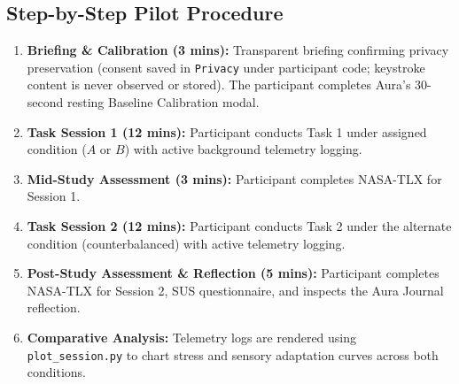 \documentclass[11pt,a4paper]{article}
\begin{document}
\subsection{Step-by-Step Pilot Procedure}
\begin{enumerate}[leftmargin=1.5em, itemsep=3pt]
    \item \textbf{Briefing \& Calibration (3 mins):} Transparent briefing confirming privacy preservation (consent saved in \texttt{Privacy} under participant code; keystroke content is never observed or stored). The participant completes Aura's 30-second resting Baseline Calibration modal.
    \item \textbf{Task Session 1 (12 mins):} Participant conducts Task 1 under assigned condition ($A$ or $B$) with active background telemetry logging.
    \item \textbf{Mid-Study Assessment (3 mins):} Participant completes NASA-TLX for Session 1.
    \item \textbf{Task Session 2 (12 mins):} Participant conducts Task 2 under the alternate condition (counterbalanced) with active telemetry logging.
    \item \textbf{Post-Study Assessment \& Reflection (5 mins):} Participant completes NASA-TLX for Session 2, SUS questionnaire, and inspects the Aura Journal reflection.
    \item \textbf{Comparative Analysis:} Telemetry logs are rendered using \texttt{plot\_session.py} to chart stress and sensory adaptation curves across both conditions.
\end{enumerate}
\end{document}
